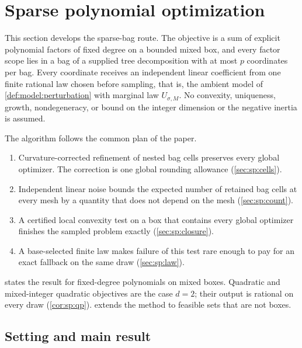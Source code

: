 \section{Sparse polynomial optimization}\label{sec:sp}

This section develops the sparse-bag route. The objective is a sum of
explicit polynomial factors of fixed degree on a bounded mixed box, and every
factor scope lies in a bag of a supplied tree decomposition with at most $p$
coordinates per bag. Every coordinate receives an independent linear
coefficient from one finite rational law chosen before sampling, that is,
the ambient model of \cref{def:model:perturbation} with marginal law
$U_{\sigma,M}$. No convexity, uniqueness, growth, nondegeneracy, or bound on
the integer dimension or the negative inertia is assumed.

The algorithm follows the common plan of the paper.
\begin{enumerate}[label=(\roman*)]
\item Curvature-corrected refinement of nested bag cells preserves every
global optimizer. The correction is one global rounding allowance
(\cref{sec:sp:cells}).
\item Independent linear noise bounds the expected number of retained bag
cells at every mesh by a quantity that does not depend on the mesh
(\cref{sec:sp:count}).
\item A certified local convexity test on a box that contains every global
optimizer finishes the sampled problem exactly (\cref{sec:sp:closure}).
\item A base-selected finite law makes failure of this test rare enough to
pay for an exact fallback on the same draw (\cref{sec:sp:law}).
\end{enumerate}
 states the result for fixed-degree polynomials on mixed
boxes. Quadratic and mixed-integer quadratic objectives are the case $d=2$;
their output is rational on every draw (\cref{cor:sp:qp}).
 extends the method to feasible sets that are not boxes.

\subsection{Setting and main result}\label{sec:sp:setting}

